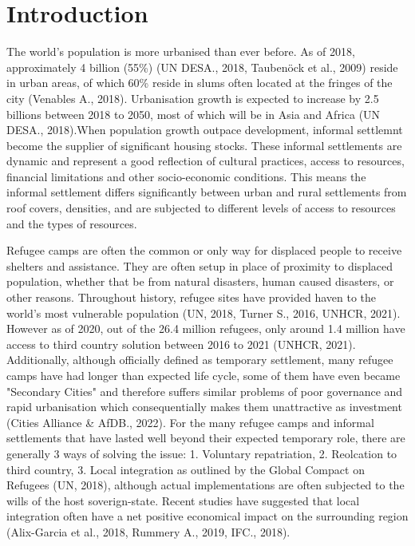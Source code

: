 \documentclass[11pt, a4paper, twoside]{report}
\begin{document}
\tableofcontents

\newpage

\chapter{Introduction}\label{Intro}

The world’s population is more urbanised than ever before. As of 2018, approximately 4 billion (55\%) (UN DESA., 2018, Taubenöck et al., 2009) reside in urban areas, of which 60\% reside in slums often located at the fringes of the city (Venables A., 2018). Urbanisation growth is expected to increase by 2.5 billions between 2018 to 2050, most of which will be in Asia and Africa (UN DESA., 2018).When population growth outpace development, informal settlemnt become the supplier of significant housing stocks. These informal settlements are dynamic and represent a good reflection of cultural practices, access to resources, financial limitations and other socio-economic conditions. This means the informal settlement differs significantly between urban and rural settlements from roof covers, densities, and are subjected to different levels of access to resources and the types of resources.\\\par

Refugee camps are often the common or only way for displaced people to receive shelters and assistance. They are often setup in place of proximity to displaced population, whether that be from natural disasters, human caused disasters, or other reasons. Throughout history, refugee sites have provided haven to the world's most vulnerable population (UN, 2018, Turner S., 2016, UNHCR, 2021). However as of 2020, out of the 26.4 million refugees, only around 1.4 million have access to third country solution between 2016 to 2021 (UNHCR, 2021). Additionally, although officially defined as temporary settlement, many refugee camps have had longer than expected life cycle, some of them have even became "Secondary Cities" and therefore suffers similar problems of poor governance and rapid urbanisation which consequentially makes them unattractive as investment (Cities Alliance \& AfDB., 2022). For the many refugee camps and informal settlements that have lasted well beyond their expected temporary role, there are  generally 3 ways of solving the issue: 1. Voluntary repatriation, 2. Reolcation to third country, 3. Local integration as outlined by the Global Compact on Refugees (UN, 2018), although actual implementations are often subjected to the wills of the host soverign-state. Recent studies have suggested that local integration often have a net positive economical impact on the surrounding region (Alix-Garcia et al., 2018, Rummery A., 2019, IFC., 2018). \\\par
\end{document}
